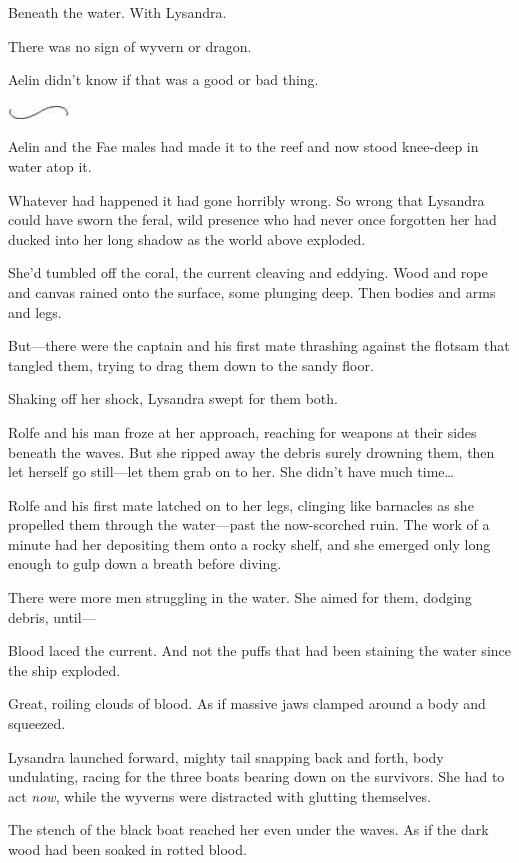 Beneath the water. With Lysandra.

There was no sign of wyvern or dragon.

Aelin didn't know if that was a good or bad thing.

\includegraphics[width=0.65in,height=0.13in]{images/seperator}

Aelin and the Fae males had made it to the reef and now stood knee-deep in water atop it.

Whatever had happened  it had gone horribly wrong. So wrong that Lysandra could have sworn the feral, wild presence who had never once forgotten her had ducked into her long shadow as the world above exploded.

She'd tumbled off the coral, the current cleaving and eddying. Wood and rope and canvas rained onto the surface, some plunging deep. Then bodies and arms and legs.

But---there were the captain and his first mate thrashing against the flotsam that tangled them, trying to drag them down to the sandy floor.

Shaking off her shock, Lysandra swept for them both.

Rolfe and his man froze at her approach, reaching for weapons at their sides beneath the waves. But she ripped away the debris surely drowning them, then let herself go still---let them grab on to her. She didn't have much time\ldots{}

Rolfe and his first mate latched on to her legs, clinging like barnacles as she propelled them through the water---past the now-scorched ruin. The work of a minute had her depositing them onto a rocky shelf, and she emerged only long enough to gulp down a breath before diving.

There were more men struggling in the water. She aimed for them, dodging debris, until---

Blood laced the current. And not the puffs that had been staining the water since the ship exploded.

Great, roiling clouds of blood. As if massive jaws clamped around a body and squeezed.

Lysandra launched forward, mighty tail snapping back and forth, body undulating, racing for the three boats bearing down on the survivors. She had to act \emph{now}, while the wyverns were distracted with glutting themselves.

The stench of the black boat reached her even under the waves. As if the dark wood had been soaked in rotted blood.


